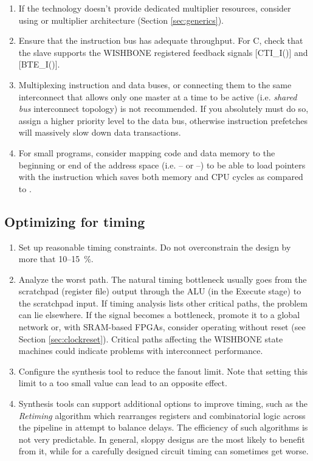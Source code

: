 \documentclass[a4paper,12pt,twoside,extrafontsizes]{memoir}
\begin{document}
\begin{enumerate}
	\item If the technology doesn't provide dedicated multiplier resources, consider using  or  multiplier architecture (Section \ref{sec:generics}).
	
	\item Ensure that the instruction bus has adequate throughput. For \lxp{}C, check that the slave supports the WISHBONE registered feedback signals [CTI\_I()] and [BTE\_I()].
	
	\item Multiplexing instruction and data buses, or connecting them to the same interconnect that allows only one master at a time to be active (i.e. \emph{shared bus} interconnect topology) is not recommended. If you absolutely must do so, assign a higher priority level to the data bus, otherwise instruction prefetches will massively slow down data transactions.
	
	\item For small programs, consider mapping code and data memory to the beginning or end of the address space (i.e. -- or --) to be able to load pointers with the  instruction which saves both memory and CPU cycles as compared to .
\end{enumerate}

\subsection{Optimizing for timing}

\begin{enumerate}
	\item Set up reasonable timing constraints. Do not overconstrain the design by more that 10--15~\%.
	
	\item Analyze the worst path. The natural \lxp{} timing bottleneck usually goes from the scratchpad (register file) output through the ALU (in the Execute stage) to the scratchpad input. If timing analysis lists other critical paths, the problem can lie elsewhere. If the  signal becomes a bottleneck, promote it to a global network or, with SRAM-based FPGAs, consider operating without reset (see Section \ref{sec:clockreset}). Critical paths affecting the WISHBONE state machines could indicate problems with interconnect performance.
	
	\item Configure the synthesis tool to reduce the fanout limit. Note that setting this limit to a too small value can lead to an opposite effect.
	
	\item Synthesis tools can support additional options to improve timing, such as the \emph{Retiming} algorithm which rearranges registers and combinatorial logic across the pipeline in attempt to balance delays. The efficiency of such algorithms is not very predictable. In general, sloppy designs are the most likely to benefit from it, while for a carefully designed circuit timing can sometimes get worse.
\end{enumerate}
\end{document}
